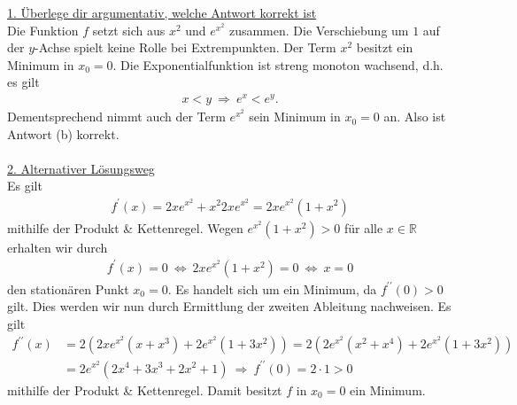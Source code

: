 \underline{1. Überlege dir argumentativ, welche Antwort korrekt ist}\\
Die Funktion $ f $ setzt sich aus $ x^2 $ und $ e^{x^2} $ zusammen.
Die Verschiebung um $ 1 $ auf der $ y $-Achse spielt keine Rolle bei Extrempunkten. Der Term $ x^2 $ besitzt ein Minimum in $ x_0 = 0 $. Die Exponentialfunktion ist streng monoton wachsend, d.h.
es gilt
\begin{align*}
x < y \ \Rightarrow \ e^x < e^y.
\end{align*}
Dementsprechend nimmt auch der Term $ e^{x^2}  $ sein Minimum in $ x_0 = 0 $ an. Also ist Antwort (b) korrekt.\\
\\
\underline{2. Alternativer Lösungsweg}\\
Es gilt
\begin{align*}
f^\prime(x) = 2 x e^{x^2} + x^2 2 x e^{x^2} = 2x e^{x^2} ( 1 + x^2)
\end{align*}
mithilfe der Produkt \& Kettenregel.
Wegen $ e^{x^2} ( 1 + x^2)  > 0$ für alle $ x \in \mathbb{R} $ erhalten wir durch
\begin{align*}
f^\prime(x) = 0 \ \Leftrightarrow \ 
2x e^{x^2} ( 1 + x^2) = 0
\
\Leftrightarrow
\
x = 0
\end{align*}
den stationären Punkt $ x_0 = 0 $. 
Es handelt sich um ein Minimum, da $ f^{\prime \prime}(0) > 0 $ gilt. Dies werden wir nun durch Ermittlung der zweiten Ableitung nachweisen. Es gilt
\begin{align*}
f^{\prime \prime}(x)
&=
2 ( 2x e^{x^2} (x + x^3)  + 2 e^{x^2} (1 + 3 x^2 ))
=
2 ( 2 e^{x^2} (x^2 + x^4) + 2  e^{x^2} ( 1 + 3 x^2))\\
&=
2  e^{x^2} ( 2 x^4  + 3x^3 +  2x^2   + 1)
\
\Rightarrow
\
f^{\prime \prime}(0) = 2 \cdot 1 > 0
\end{align*}
mithilfe der Produkt \& Kettenregel.
Damit besitzt $ f $ in $ x_0 = 0  $ ein Minimum.
\newpage
